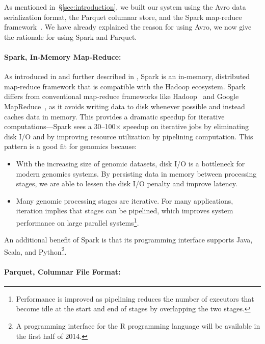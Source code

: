 \documentclass{bioinfo}
\begin{document}
As mentioned in~\S\ref{sec:introduction}, we built our system using the Avro data serialization format, the Parquet columnar store, and the Spark map-reduce
framework~\citep{avro, parquet, zaharia10}. We have already explained the reason for using Avro, we now give the rationale for using Spark and Parquet.

\paragraph{Spark, In-Memory Map-Reduce:}
\label{sec:spark}

As introduced in \citet{zaharia10} and further described in \citet{zaharia12}, Spark is an in-memory, distributed map-reduce framework that is
compatible with the Hadoop ecosystem. Spark differs from conventional map-reduce frameworks
like Hadoop~\citep{hadoop} and Google MapReduce~\citep{dean08}, as it avoids writing data to disk whenever possible and instead caches
data in memory. This provides a dramatic speedup for iterative computations---Spark sees a 30--100$\times$ speedup on iterative jobs by eliminating
disk I/O and by improving resource utilization by pipelining computation. This pattern is a good fit for genomics because:

\begin{itemize}
\item With the increasing size of genomic datasets, disk I/O is a bottleneck for modern genomics systems. By persisting data in memory between processing stages,
we are able to lessen the disk I/O penalty and improve latency.
\item Many genomic processing stages are iterative. For many applications, iteration implies that stages can be pipelined, which improves system performance on large
parallel systems\footnote{Performance is improved as pipelining reduces the number of executors that become idle at the start and end of stages by overlapping the
two stages.}. 
\end{itemize}

An additional benefit of Spark is that its programming interface supports Java, Scala, and Python\footnote{A programming interface for the R programming language will
be available in the first half of 2014.}.

\paragraph{Parquet, Columnar File Format:}
\label{sec:parquet}
\end{document}
